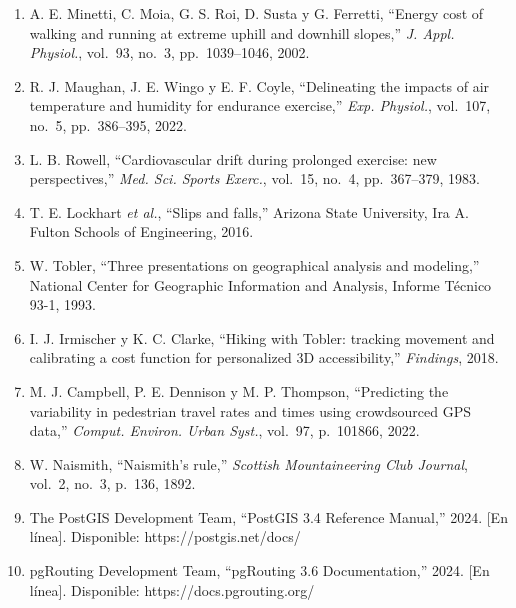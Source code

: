 \documentclass[10pt,letterpaper,twocolumn]{article}
\begin{document}
{\fontsize{9}{11}\selectfont
\begin{enumerate}
  \setlength\itemsep{2pt}
  \setlength\parskip{0pt}

  \item A. E. Minetti, C. Moia, G. S. Roi, D. Susta y G. Ferretti,
        ``Energy cost of walking and running at extreme uphill and downhill
        slopes,'' \textit{J. Appl. Physiol.}, vol.~93, no.~3,
        pp.~1039--1046, 2002.

  \item R. J. Maughan, J. E. Wingo y E. F. Coyle, ``Delineating the
        impacts of air temperature and humidity for endurance exercise,''
        \textit{Exp. Physiol.}, vol.~107, no.~5, pp.~386--395, 2022.

  \item L. B. Rowell, ``Cardiovascular drift during prolonged exercise:
        new perspectives,'' \textit{Med. Sci. Sports Exerc.}, vol.~15,
        no.~4, pp.~367--379, 1983.

  \item T. E. Lockhart \textit{et al.}, ``Slips and falls,'' Arizona State
        University, Ira A. Fulton Schools of Engineering, 2016.

  \item W. Tobler, ``Three presentations on geographical analysis and
        modeling,'' National Center for Geographic Information and
        Analysis, Informe T\'{e}cnico 93-1, 1993.

  \item I. J. Irmischer y K. C. Clarke, ``Hiking with Tobler: tracking
        movement and calibrating a cost function for personalized 3D
        accessibility,'' \textit{Findings}, 2018.

  \item M. J. Campbell, P. E. Dennison y M. P. Thompson, ``Predicting the
        variability in pedestrian travel rates and times using crowdsourced
        GPS data,'' \textit{Comput. Environ. Urban Syst.}, vol.~97,
        p.~101866, 2022.

  \item W. Naismith, ``Naismith's rule,'' \textit{Scottish Mountaineering
        Club Journal}, vol.~2, no.~3, p.~136, 1892.

  \item The PostGIS Development Team, ``PostGIS 3.4 Reference Manual,''
        2024. [En l\'{i}nea]. Disponible: https://postgis.net/docs/

  \item pgRouting Development Team, ``pgRouting 3.6 Documentation,''
        2024. [En l\'{i}nea]. Disponible: https://docs.pgrouting.org/


\end{enumerate}}
\end{document}
